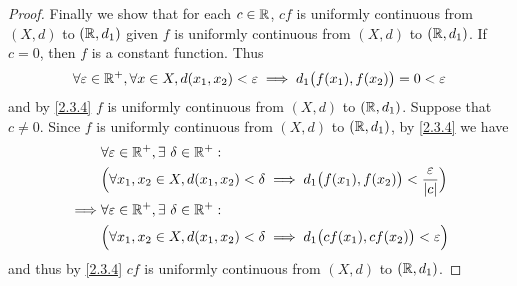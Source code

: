 \begin{proof}
  Finally we show that for each \(c \in \mathbb{R}\), \(cf\) is uniformly continuous from \((X, d)\) to \((\mathbb{R}, d_1)\) given \(f\) is uniformly continuous from \((X, d)\) to \((\mathbb{R}, d_1)\).
  If \(c = 0\), then \(f\) is a constant function.
  Thus
  \[
    \forall \varepsilon \in \mathbb{R}^+, \forall x \in X, d(x_1, x_2) < \varepsilon \implies d_1\big(f(x_1), f(x_2)\big) = 0 < \varepsilon
  \]
  and by \cref{2.3.4} \(f\) is uniformly continuous from \((X, d)\) to \((\mathbb{R}, d_1)\).
  Suppose that \(c \neq 0\).
  Since \(f\) is uniformly continuous from \((X, d)\) to \((\mathbb{R}, d_1)\), by \cref{2.3.4} we have
  \begin{align*}
             & \forall \varepsilon \in \mathbb{R}^+, \exists\ \delta \in \mathbb{R}^+:                                                                    \\
             & \Big(\forall x_1, x_2 \in X, d(x_1, x_2) < \delta \implies d_1\big(f(x_1), f(x_2)\big) < \dfrac{\varepsilon}{\left\lvert c\right\rvert}\Big) \\
    \implies & \forall \varepsilon \in \mathbb{R}^+, \exists\ \delta \in \mathbb{R}^+:                                                                    \\
             & \Big(\forall x_1, x_2 \in X, d(x_1, x_2) < \delta \implies d_1\big(cf(x_1), cf(x_2)\big) < \varepsilon\Big)
  \end{align*}
  and thus by \cref{2.3.4} \(cf\) is uniformly continuous from \((X, d)\) to \((\mathbb{R}, d_1)\).
\end{proof}